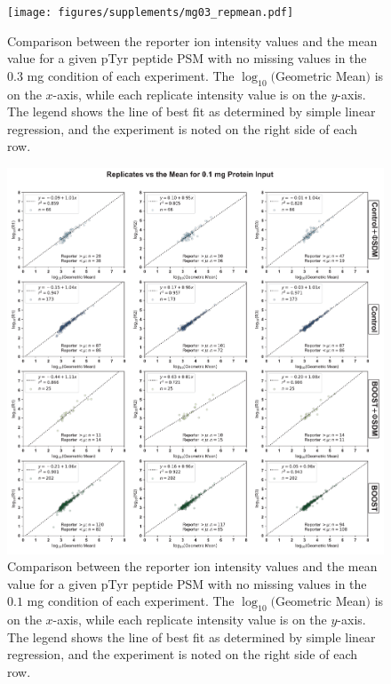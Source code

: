 \documentclass[journal=jprobs,manuscript=article]{achemso}
\begin{document}
\begin{figure}
\centering
\texttt{[image: figures/supplements/mg03\_repmean.pdf]}
\caption{Comparison between the reporter ion intensity values and the mean value  for a given pTyr peptide PSM with no missing values in the $0.3$ mg condition of each experiment. The $\log_{10}($Geometric Mean$)$ is on the $x$-axis, while each replicate intensity value is on the $y$-axis. The legend shows the line of best fit as determined by simple linear regression\cite{grus2019data}, and the experiment is noted on the right side of each row. }\label{mg03_repmean}
\end{figure}

\clearpage

\begin{figure}
\centering
\includegraphics[width=175mm]{figures/supplements/mg01_repmean.pdf}
\caption{Comparison between the reporter ion intensity values and the mean value  for a given pTyr peptide PSM with no missing values in the $0.1$ mg condition of each experiment. The $\log_{10}($Geometric Mean$)$ is on the $x$-axis, while each replicate intensity value is on the $y$-axis. The legend shows the line of best fit as determined by simple linear regression\cite{grus2019data}, and the experiment is noted on the right side of each row. }\label{mg01_repmean}
\end{figure}
\end{document}
